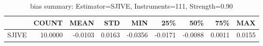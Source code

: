 \begin{table}[ht]
\centering
\caption{bias summary: Estimator=SJIVE, Instruments=111, Strength=0.90}
\begin{tabular}{lrrrrrrrr}
\toprule
 & COUNT & MEAN & STD & MIN & 25\% & 50\% & 75\% & MAX \\
\midrule
SJIVE & 10.0000 & -0.0103 & 0.0163 & -0.0356 & -0.0171 & -0.0088 & 0.0011 & 0.0155 \\
\bottomrule
\end{tabular}
\end{table}
